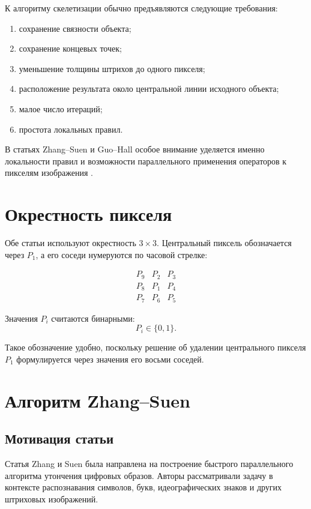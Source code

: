 \documentclass[12pt,a4paper]{article}
\begin{document}
К алгоритму скелетизации обычно предъявляются следующие требования:

\begin{enumerate}
    \item сохранение связности объекта;
    \item сохранение концевых точек;
    \item уменьшение толщины штрихов до одного пикселя;
    \item расположение результата около центральной линии исходного объекта;
    \item малое число итераций;
    \item простота локальных правил.
\end{enumerate}

В статьях Zhang--Suen и Guo--Hall особое внимание уделяется именно локальности правил и возможности параллельного применения операторов к пикселям изображения \cite{zhang1984,guo1989}.

\section{Окрестность пикселя}

Обе статьи используют окрестность $3\times3$. Центральный пиксель обозначается через $P_1$, а его соседи нумеруются по часовой стрелке:

\[
\begin{array}{ccc}
P_9 & P_2 & P_3 \\
P_8 & P_1 & P_4 \\
P_7 & P_6 & P_5
\end{array}
\]

Значения $P_i$ считаются бинарными:
\[
    P_i \in \{0,1\}.
\]

Такое обозначение удобно, поскольку решение об удалении центрального пикселя $P_1$ формулируется через значения его восьми соседей.

\section{Алгоритм Zhang--Suen}

\subsection{Мотивация статьи}

Статья Zhang и Suen \cite{zhang1984} была направлена на построение быстрого параллельного алгоритма утончения цифровых образов. Авторы рассматривали задачу в контексте распознавания символов, букв, идеографических знаков и других штриховых изображений.
\end{document}
